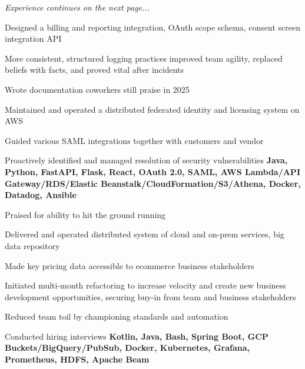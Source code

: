 \documentclass[a4paper,10pt]{article}
\begin{document}
            \vspace{30pt}
            \hspace{10pt}\textit{Experience continues on the next page...}

            \begin{resume_list}
              \item Designed a billing and reporting integration, OAuth scope schema, consent screen integration API
              \item More consistent, structured logging practices improved team agility, replaced beliefs with facts, and proved vital after incidents
              \item Wrote documentation coworkers still praise in 2025
              \item Maintained and operated a distributed federated identity and licensing system on AWS
              \item Guided various SAML integrations together with customers and vendor
              \item Proactively identified and managed resolution of security vulnerabilities
              \newline \textbf{Java, Python, FastAPI, Flask, React, OAuth 2.0, SAML, AWS Lambda/API Gateway/RDS/Elastic Beanstalk/CloudFormation/S3/Athena, Docker, Datadog, Ansible}
            \end{resume_list}


            \begin{resume_list}
              \item Praised for ability to hit the ground running
              \item Delivered and operated distributed system of cloud and on-prem services, big data repository
              \item Made key pricing data accessible to ecommerce business stakeholders
              \item Initiated multi-month refactoring to increase velocity and create new business development opportunities, securing buy-in from team and business stakeholders
              \item Reduced team toil by championing standards and automation
              \item Conducted hiring interviews
              \newline \textbf{Kotlin, Java, Bash, Spring Boot, GCP Buckets/BigQuery/PubSub, Docker, Kubernetes, Grafana, Prometheus, HDFS, Apache Beam}
            \end{resume_list}
\end{document}
